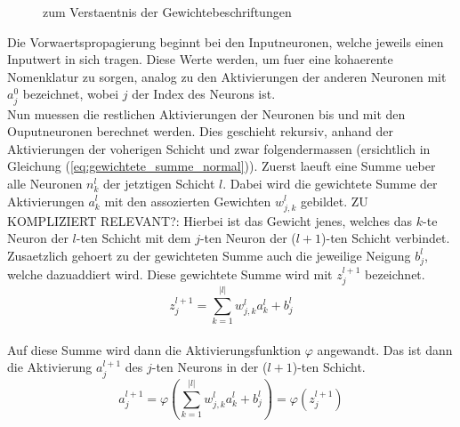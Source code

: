 \para{}
\begin{figure}[h!]
  \centering
  \label{fig:nomenklatur2}
  \caption{zum Verstaentnis der Gewichtebeschriftungen}
\end{figure}
\para{}
Die Vorwaertspropagierung beginnt bei den Inputneuronen, welche jeweils
einen Inputwert in sich tragen. Diese Werte werden, um fuer eine kohaerente Nomenklatur zu sorgen,
analog zu den Aktivierungen der anderen Neuronen mit $a_j^0$ bezeichnet, wobei
$j$ der Index des Neurons ist. \\
Nun muessen die restlichen Aktivierungen der Neuronen bis und mit den Ouputneuronen berechnet werden. Dies geschieht rekursiv, anhand der
Aktivierungen der voherigen Schicht und zwar folgendermassen (ersichtlich in
Gleichung (\ref{eq:gewichtete_summe_normal})).
\para{}
Zuerst laeuft eine Summe ueber alle Neuronen $n_k^{l}$ der jetztigen Schicht
$l$. Dabei wird die gewichtete Summe der Aktivierungen $a_k^{l}$ mit den
assozierten Gewichten $w_{j,k}^l$ gebildet. ZU KOMPLIZIERT RELEVANT?: Hierbei ist das Gewicht jenes, welches das
$k$-te Neuron der $l$-ten Schicht mit dem $j$-ten Neuron der ($l+1$)-ten Schicht verbindet.
Zusaetzlich gehoert zu der gewichteten Summe auch die jeweilige Neigung $b_j^l$, welche
dazuaddiert wird. Diese gewichtete Summe wird mit $z_j^{l+1}$ bezeichnet.
\\
\begin{equation}\tag{FP1}\label{eq:gewichtete_summe_normal}
  z_j^{l+1} = \sum_{k=1}^{|l|} w_{j,k}^l a_k^l + b_j^l
\end{equation}
\\
Auf diese Summe wird dann die Aktivierungsfunktion $\varphi$ angewandt.
Das ist dann die Aktivierung $a_j^{l+1}$ des $j$-ten Neurons in der ($l+1$)-ten Schicht.
\\
\begin{equation}\tag{FP2}\label{eq:aktivierung_normal}
  a_j^{l+1} = \varphi\left(\sum_{k=1}^{|l|} w_{j,k}^l a_k^{l} + b_j^l \right) = \varphi \left( z_j^{l+1} \right)
\end{equation}
